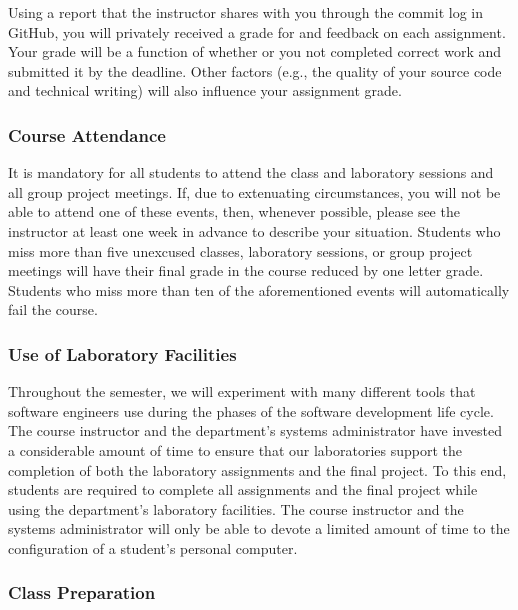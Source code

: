 \documentclass[11pt]{article}
\begin{document}
Using a report that the instructor shares with you through the commit log in GitHub, you will privately received a grade
for and feedback on each assignment. Your grade will be a function of whether or you not completed correct work and
submitted it by the deadline. Other factors (e.g., the quality of your source code and technical writing) will also
influence your assignment grade.

\subsubsection*{Course Attendance}

It is mandatory for all students to attend the class and laboratory sessions and all group project meetings. If, due to
extenuating circumstances, you will not be able to attend one of these events, then, whenever possible, please see the
instructor at least one week in advance to describe your situation. Students who miss more than five unexcused classes,
laboratory sessions, or group project meetings will have their final grade in the course reduced by one letter grade.
Students who miss more than ten of the aforementioned events will automatically fail the course.

\subsubsection*{Use of Laboratory Facilities}

Throughout the semester, we will experiment with many different tools that software engineers use during the phases of
the software development life cycle. The course instructor and the department's systems administrator have invested a
considerable amount of time to ensure that our laboratories support the completion of both the laboratory assignments
and the final project. To this end, students are required to complete all assignments and the final project while using
the department's laboratory facilities. The course instructor and the systems administrator will only be able to devote
a limited amount of time to the configuration of a student's personal computer.

\subsubsection*{Class Preparation}
\end{document}
